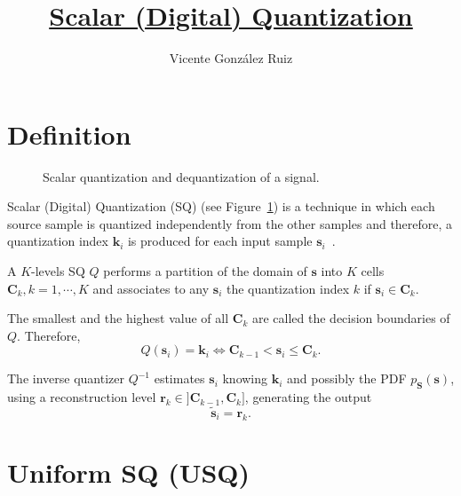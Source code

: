 
\title{\href{https://github.com/vicente-gonzalez-ruiz/scalar_quantization}{Scalar (Digital) Quantization}}

\author{Vicente González Ruiz}

\maketitle
\tableofcontents

\section{Definition}

\begin{figure}
  \caption{Scalar quantization and dequantization of a signal.}
  \label{fig:Q}
\end{figure}

Scalar (Digital) Quantization (SQ) (see Figure~\ref{fig:Q}) is a
technique in which each source sample is quantized independently from
the other samples and therefore, a quantization index ${\mathbf k}_i$
is produced for each input sample ${\mathbf
  s}_i$~\cite{vruiz__quantization}.

A $K$-levels SQ $Q$ performs a partition of the domain of ${\mathbf
  s}$ into $K$ cells ${\mathbf C}_k, k = 1, \cdots, K$ and associates
to any ${\mathbf s}_i$ the quantization index $k$ if ${\mathbf s}_i\in
{\mathbf C}_k$.

The smallest and the highest value of all ${\mathbf C}_k$ are called
the decision boundaries of $Q$. Therefore,
\begin{equation}
  Q({\mathbf s}_i) = {\mathbf k}_i \Leftrightarrow {\mathbf C}_{k-1} <
  {\mathbf s}_i \le {\mathbf C}_k.
\end{equation}

The inverse quantizer $Q^{-1}$ estimates ${\mathbf s}_i$ knowing
${\mathbf k}_i$ and possibly the PDF $p_{\mathbf S}({\mathbf s})$,
using a reconstruction level ${\mathbf r}_k\in ]{\mathbf C}_{k-1},
  {\mathbf C}_k]$, generating the output
\begin{equation}
  \tilde{\mathbf s}_i = {\mathbf r}_k.
\end{equation}


\section{Uniform SQ (USQ)}

